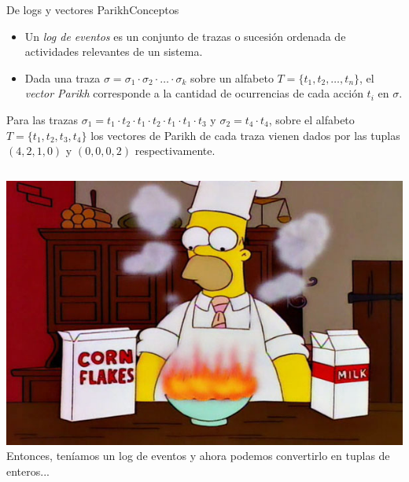 \documentclass[spanish,pdf]{beamer}
\begin{document}
\begin{frame}{De logs y vectores Parikh}{Conceptos}
  \scriptsize
  \begin{itemize}
    \setlength\itemsep{0.1cm}
    \item<1-> Un \textit{log de eventos} es un conjunto de trazas o sucesión ordenada de actividades relevantes de un sistema.

    \item<2-> Dada una traza $\sigma=\sigma_1\cdot\sigma_2\cdot\ldots\cdot\sigma_k$ sobre un alfabeto
        $T=\{t_1,t_2,\dots,t_n\}$, el \textit{vector Parikh} corresponde a la cantidad de ocurrencias
        de cada acción $t_i$ en $\sigma$.
  \end{itemize}

  \pause[3]
   \begin{example}
       Para las trazas $\sigma_1=t_1 \cdot t_2 \cdot t_1 \cdot t_2 \cdot t_1 \cdot t_1 \cdot t_3$ y $\sigma_2=t_4 \cdot t_4$,
       sobre el alfabeto $T=\{t_1,t_2,t_3,t_4\}$ los vectores de Parikh de cada traza vienen dados por las tuplas $(4,2,1,0)$ y $(0,0,0,2)$ respectivamente.
   \end{example}

  \begin{columns}
        \pause[5]
        \centering
        \includegraphics[width=1.2\linewidth]{img/homer-simpson-cooking.jpg}
        \pause[4]
        Entonces, teníamos un log de eventos y ahora podemos convertirlo en tuplas de enteros...
  \end{columns}
\end{frame}
\end{document}
